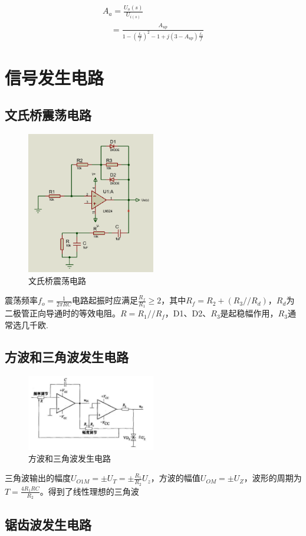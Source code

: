 \documentclass[a4paper,11pt,UTF8]{article}
\begin{document}
$$\left. \begin{array}  { l  }  { A _ { a } = \frac { U _ { o } ( s ) } { U _ { i ( s ) } } } \\ \hspace{1em}{ = \frac { A _ { up } } { 1 - ( \frac { f _ { 0 } } { f } ) ^ { 2 } - 1 + j ( 3 - A _ { up } ) \frac { f _ { 0 } } { f } } } \end{array} \right.$$

\section{信号发生电路}

\subsection{文氏桥震荡电路}
\begin{figure}[H]
	\centering
	\includegraphics[width=0.5\textwidth]{文氏桥}
	\caption{文氏桥震荡电路}
\end{figure}
震荡频率$f_o = \frac{1}{2\pi RC}$电路起振时应满足$\frac{R_f}{R_1}\geq2$，其中$R_f=R_2+(R_3//R_d)$，$R_d$为二极管正向导通时的等效电阻。$R=R_1//R_f$，D1、D2、$R_3$是起稳幅作用，$R_3$通常选几千欧.
\subsection{方波和三角波发生电路}
\begin{figure}[H]
	\centering
	\includegraphics[width=0.5\textwidth]{方波和三角波发生电路}
	\caption{方波和三角波发生电路}
\end{figure}
三角波输出的幅度$U_{O1M}=\pm U_T = \pm \frac{R_1}{R_2}U_z$，方波的幅值$U_{OM}=\pm U_Z$，波形的周期为$T=\frac{4R_1RC}{R_2}$。得到了线性理想的三角波
\subsection{锯齿波发生电路}
\end{document}
